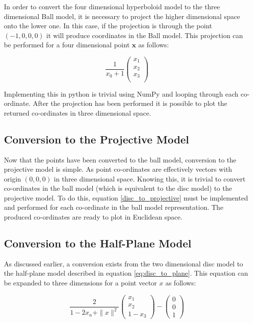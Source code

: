 In order to convert the four dimensional hyperboloid model to the three dimensional Ball model, it is necessary to project the higher dimensional space onto the lower one. In this case, if the projection is through the point $(-1, 0, 0, 0)$ it will produce coordinates in the Ball model. This projection can be performed for a four dimensional point $\boldsymbol{x}$ as follows:

\begin{equation}
\frac{1}{x_0 + 1}
\begin{pmatrix}
x_1 \\
x_2 \\
x_3 \\
\end{pmatrix}
\end{equation}

Implementing this in python is trivial using NumPy and looping through each co-ordinate. After the projection has been performed it is possible to plot the returned co-ordinates in three dimensional space. 

\subsection{Conversion to the Projective Model}

Now that the points have been converted to the ball model, conversion to the projective model is simple. As point co-ordinates are effectively vectors with origin $(0,0,0)$ in three dimensional space. Knowing this, it is trivial to convert co-ordinates in the ball model (which is equivalent to the disc model) to the projective model. To do this, equation \ref{disc_to_projective} must be implemented and performed for each co-ordinate in the ball model representation. The produced co-ordinates are ready to plot in Euclidean space.

\subsection{Conversion to the Half-Plane Model}
As discussed earlier, a conversion exists from the two dimensional disc model to the half-plane model described in equation \ref{eq:disc_to_plane}. This equation can be expanded to three dimensions for a point vector $x$ as follows:

\begin{equation}
\label{eq:disc_to_plane3}
\frac{2}{1-2x_n+\|x\|^2}
\begin{pmatrix}
x_1\\
x_2\\
1-x_3
\end{pmatrix}
- \begin{pmatrix}
0\\
0\\
1
\end{pmatrix}
\end{equation}

